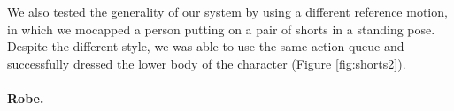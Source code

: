 We also tested the generality of our system by using a different reference motion, in which we mocapped a person putting on a pair of shorts in a standing pose. Despite the different style, we was able to use the same action queue and successfully dressed the lower body of the character (Figure \ref{fig:shorts2}).

\paragraph{Robe.}






